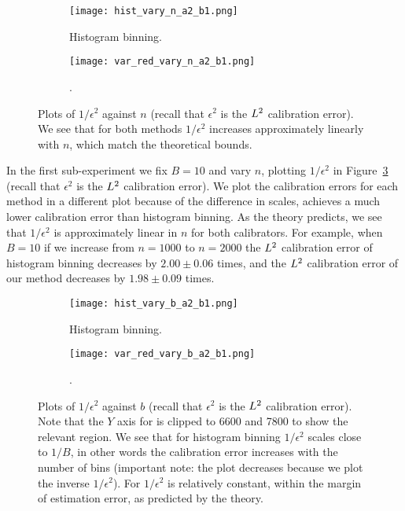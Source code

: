 \begin{figure}
  \centering
  \centering
     \begin{subfigure}[b]{0.48\textwidth}
         \centering
         \texttt{[image: hist\_vary\_n\_a2\_b1.png]}
         \caption{Histogram binning.
         }
         \label{fig:well-spec-vary-n-hist}
     \end{subfigure}
     \hfill
     \begin{subfigure}[b]{0.48\textwidth}
         \centering
         \texttt{[image: var\_red\_vary\_n\_a2\_b1.png]}
         \caption{\Ourcal{}.
         }
         \label{fig:well-spec-vary-n-var-red}
     \end{subfigure}
  \caption{
    Plots of $1/\epsilon^2$ against $n$ (recall that $\epsilon^2$ is the $L^2$ calibration error). We see that for both methods $1/\epsilon^2$ increases approximately linearly with $n$, which match the theoretical bounds.
}
  \label{fig:well-spec-vary-n}
\end{figure}

In the first sub-experiment we fix $B = 10$ and vary $n$, plotting $1/\epsilon^2$ in Figure~\ref{fig:well-spec-vary-n} (recall that $\epsilon^2$ is the $L^2$ calibration error). We plot the calibration errors for each method in a different plot because of the difference in scales, \ourcal{} achieves a much lower calibration error than histogram binning. As the theory predicts, we see that $1/\epsilon^2$ is approximately linear in $n$ for both calibrators. For example, when $B=10$ if we increase from $n=1000$ to $n=2000$ the $L^2$ calibration error of histogram binning decreases by $2.00 \pm 0.06$ times, and the $L^2$ calibration error of our method decreases by $1.98 \pm 0.09$ times.

\begin{figure}
  \centering
  \centering
     \begin{subfigure}[b]{0.48\textwidth}
         \centering
         \texttt{[image: hist\_vary\_b\_a2\_b1.png]}
         \caption{Histogram binning.
         }
         \label{fig:well-spec-vary-b-hist}
     \end{subfigure}
     \hfill
     \begin{subfigure}[b]{0.48\textwidth}
         \centering
         \texttt{[image: var\_red\_vary\_b\_a2\_b1.png]}
         \caption{\Ourcal{}.
         }
         \label{fig:well-spec-vary-b-var-red}
     \end{subfigure}
  \caption{
    Plots of $1/\epsilon^2$ against $b$ (recall that $\epsilon^2$ is the $L^2$ calibration error). Note that the $Y$ axis for \ourcal{} is clipped to 6600 and 7800 to show the relevant region. We see that for histogram binning $1/\epsilon^2$ scales close to $1/B$, in other words the calibration error increases with the number of bins (important note: the plot decreases because we plot the inverse $1/\epsilon^2$). For \ourcal{} $1/\epsilon^2$ is relatively constant, within the margin of estimation error, as predicted by the theory.
}
  \label{fig:well-spec-vary-b}
\end{figure}

